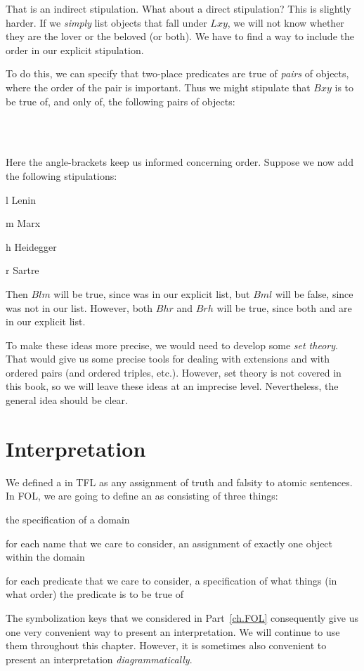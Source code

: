That is an indirect stipulation. What about a direct stipulation? This is slightly harder. If we \emph{simply} list objects that fall under $Lxy$, we will not know whether they are the lover or the beloved (or both). We have to find a way to include the order in our explicit stipulation. 

To do this, we can specify that two-place predicates are true of \emph{pairs} of objects, where the order of the pair is important. Thus we might stipulate that $Bxy$ is to be true of, and only of, the following pairs of objects:
	\begin{center}
		\\
		\\
	\end{center}
Here the angle-brackets keep us informed concerning order. Suppose we now add the following stipulations:
	\begin{ekey}
		\item[l] Lenin
		\item[m] Marx
		\item[h] Heidegger
		\item[r] Sartre
	\end{ekey}
Then $Blm$ will be true, since  was in our explicit list, but $Bml$ will be false, since  was not in our list. However, both $Bhr$ and $Brh$ will be true, since both  and  are in our explicit list.

To make these ideas more precise, we would need to develop some \emph{set theory}. That would give us some precise tools for dealing with extensions and with ordered pairs (and ordered triples, etc.). However, set theory is not covered in this book, so we will leave these ideas at an imprecise level. Nevertheless, the general idea should be clear.




\section{Interpretation}
We defined a  in TFL as any assignment of truth and falsity to atomic sentences. In FOL, we are going to define an  as consisting of three things:
	\begin{ebullet}	
		\item the specification of a domain
		\item for each name that we care to consider, an assignment of exactly one object within the domain 
		\item for each predicate that we care to consider, a specification of what things (in what order) the predicate is to be true of
	\end{ebullet}
The symbolization keys that we considered in Part~\ref{ch.FOL} consequently give us one very convenient way to present an interpretation. We will continue to use them throughout this chapter. However, it is sometimes also convenient to present an interpretation \emph{diagrammatically}. 

